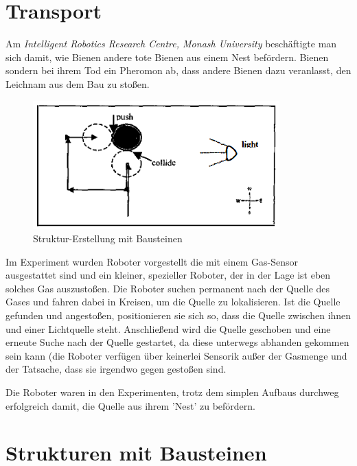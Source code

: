 \section{Transport}

Am \textit{Intelligent Robotics Research Centre, Monash University} beschäftigte man sich damit, wie Bienen andere tote Bienen aus einem Nest befördern. Bienen sondern bei ihrem Tod ein Pheromon ab, dass andere Bienen dazu veranlasst, den Leichnam aus dem Bau zu stoßen.

\begin{figure}
	\includegraphics[width=\pictureWidthBig,keepaspectratio]{graphics/PaperBienen.png}
	\caption{Struktur-Erstellung mit Bausteinen}
	\label{pic:StrukturenKloetze}
\end{figure}

Im Experiment wurden Roboter vorgestellt die mit einem Gas-Sensor ausgestattet sind und ein kleiner, spezieller Roboter, der in der Lage ist eben solches Gas auszustoßen. Die Roboter suchen permanent nach der Quelle des Gases und fahren dabei in Kreisen, um die Quelle zu lokalisieren. Ist die Quelle gefunden und angestoßen, positionieren sie sich so, dass die Quelle zwischen ihnen und einer Lichtquelle steht. Anschließend wird die Quelle geschoben und eine erneute Suche nach der Quelle gestartet, da diese unterwegs abhanden gekommen sein kann (die Roboter verfügen über keinerlei Sensorik außer der Gasmenge und der Tatsache, dass sie irgendwo gegen gestoßen sind.

Die Roboter waren in den Experimenten, trotz dem simplen Aufbaus durchweg erfolgreich damit, die Quelle aus ihrem 'Nest' zu befördern.
\cite{RobotPheromones}

\section{Strukturen mit Bausteinen}


